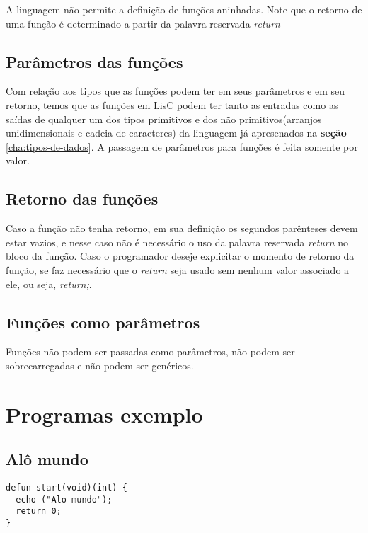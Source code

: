 \documentclass[
  12pt,				%
  oneside,			%
  a4paper,			%
  english,			%
  french,				%
  spanish,			%
  brazil,				%
]{abntex2}
\begin{document}
A linguagem não permite a definição de funções aninhadas. Note que o
retorno de uma função é determinado a partir da palavra reservada
\emph{return}

\section{Parâmetros das funções}
\label{sec:parametros-das-funções}

Com relação aos tipos que as funções podem ter em seus
parâmetros e em seu retorno, temos que as funções em LisC podem ter
tanto as entradas como as saídas de qualquer um dos tipos primitivos e
dos não primitivos(arranjos unidimensionais e cadeia de caracteres) da
linguagem já apresenados na \textbf{seção} \ref{cha:tipos-de-dados}. A
passagem de parâmetros para funções é feita somente por valor.

\section{Retorno das funções}
\label{sec:returno-das-funcoes}

Caso a função não tenha retorno, em sua definição os segundos parênteses
devem estar vazios, e nesse caso não é necessário o uso da palavra
reservada \emph{return} no bloco da função. Caso o programador deseje
explicitar o momento de retorno da função, se faz necessário que o
\emph{return} seja usado sem nenhum valor associado a ele, ou
seja, \emph{return;}.

\section{Funções como parâmetros}
\label{sec:funções-como-parametros}

Funções não podem ser passadas como parâmetros, não podem ser
sobrecarregadas e não podem ser genéricos.

\chapter{Programas exemplo}
\label{cha:programas-exemplo}

\section{Alô mundo}
\label{sec:alo-mundo}

\begin{lstlisting}[label=code:alo-mundo,caption=Programa Alô mundo]
defun start(void)(int) {
  echo ("Alo mundo");
  return 0;
}
\end{lstlisting}
\end{document}
